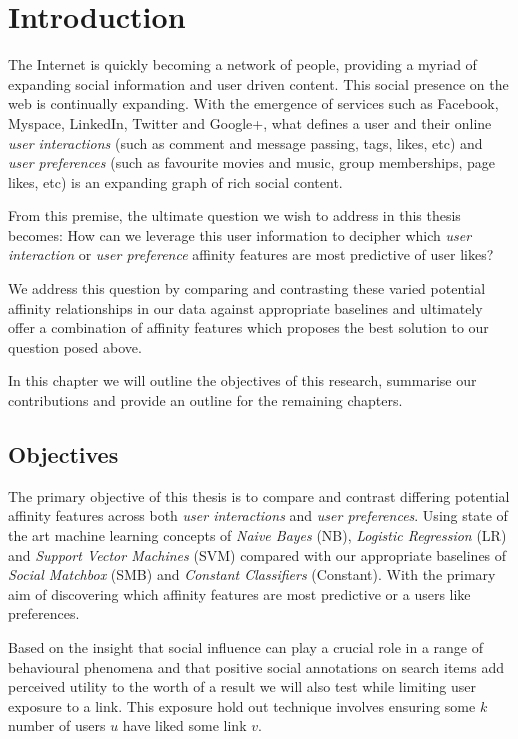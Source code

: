 
\chapter{Introduction}
\label{cha:intro}

The Internet is quickly becoming a network of people, providing a myriad of expanding social information and user driven content. 
This social presence on the web is continually expanding. With the emergence of services such as Facebook, Myspace, LinkedIn, Twitter 
and Google+, what defines a user and their online \emph{user interactions} (such as comment and message passing, tags, likes, etc) and \emph{user preferences} 
(such as favourite movies and music, group memberships, page likes, etc) is an expanding graph of rich social content. 

From this premise, the ultimate question we wish to address in this thesis becomes: 
How can we leverage this user information to decipher which \emph{user interaction} or \emph{user preference} affinity features 
are most predictive of user likes? 

We address this question by comparing and contrasting these varied potential affinity relationships in our data against appropriate 
baselines and ultimately offer a combination of affinity features which proposes the best solution to our question posed above.

In this chapter we will outline the objectives of this research, summarise our contributions and provide an outline for the remaining
chapters.

\section{Objectives}
\label{sec:objectives}

The primary objective of this thesis is to compare and contrast differing potential affinity features across both \emph{user interactions} and 
\emph{user preferences}. Using state of the art machine learning concepts of \emph{Naive Bayes} (NB), \emph{Logistic Regression} (LR) 
and \emph{Support Vector Machines} (SVM) compared with our appropriate baselines of \emph{Social Matchbox} (SMB) and \emph{Constant Classifiers} (Constant). 
With the primary aim of discovering which affinity features are most predictive or a users like preferences.

Based on the insight that social inﬂuence can play a crucial role in a range of behavioural phenomena \cite{grano,watts} and that
positive social annotations on search items add perceived utility to the worth of a result \cite{pantel} we will 
also test while limiting user exposure to a link. This exposure hold out technique involves ensuring some $k$ number of users $u$ have 
liked some link $v$.

